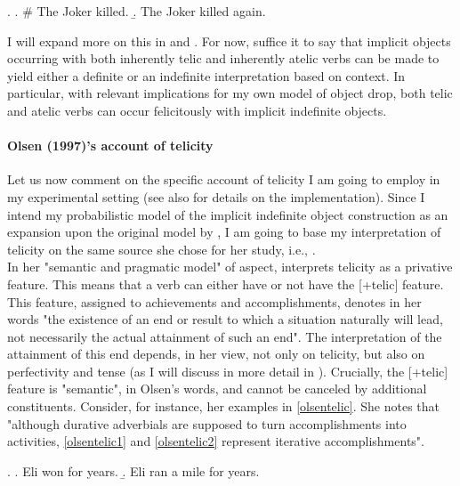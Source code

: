 \ex. \label{goldbergtelic} \a. \label{goldbergtelic1} \# The Joker killed.
\b. \label{goldbergtelic2} The Joker killed again.

I will expand more on this in  and . For now, suffice it to say that implicit objects occurring with both inherently telic and inherently atelic verbs can be made to yield either a definite or an indefinite interpretation based on context. In particular, with relevant implications for my own model of object drop, both telic and atelic verbs can occur felicitously with implicit indefinite objects.

\paragraph{Olsen (1997)'s account of telicity}
Let us now comment on the specific account of telicity I am going to employ in my experimental setting (see also  for details on the implementation). Since I intend my probabilistic model of the implicit indefinite object construction as an expansion upon the original model by \textcite{Medina2007}, I am going to base my interpretation of telicity on the same source she chose for her study, i.e., \textcite{Olsen1997}.\\
In her "semantic and pragmatic model" of aspect, \textcite{Olsen1997} interprets telicity as a privative feature. This means that a verb can either have or not have the [+telic] feature. This feature, assigned to achievements and accomplishments, denotes in her words "the existence of an end or result to which a situation naturally will lead, not necessarily the actual attainment of such an end". The interpretation of the attainment of this end depends, in her view, not only on telicity, but also on perfectivity and tense (as I will discuss in more detail in ). Crucially, the [+telic] feature is "semantic", in Olsen's words, and cannot be canceled by additional constituents. Consider, for instance, her examples in \ref{olsentelic}. She notes that "although durative adverbials are supposed to turn accomplishments into activities, \ref{olsentelic1} and \ref{olsentelic2} represent iterative accomplishments".

\ex. \label{olsentelic} \a. \label{olsentelic1} Eli won for years.
\b. \label{olsentelic2} Eli ran a mile for years.

